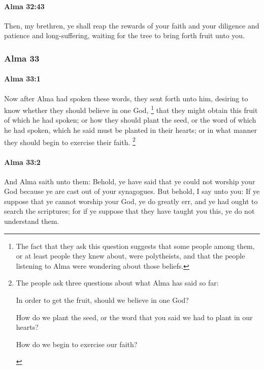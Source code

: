 		\paragraph{Alma 32:43} %
			\label{ALMA-32-43}

			Then, my brethren, ye shall reap the rewards of your faith
			and your diligence and patience and long-suffering,
			waiting for the tree to bring forth fruit unto you.

	\subsubsection{Alma 33} %
		\label{ALMA-33}
		
		\paragraph{Alma 33:1} %
			\label{ALMA-33-1}

			Now after Alma had spoken these words,
			they sent forth unto him, desiring to know
			whether they should believe in one God,%
				\footnote{%
					The fact that they ask this question suggests that some people among them, or at least people they knew about, were polytheists, and that the people listening to Alma were wondering about those beliefs.
					}
			that they might obtain this fruit of which he had spoken;
			or how they should plant the seed, or the word of which he had spoken,
			which he said must be planted in their hearts;
			or in what manner they should begin to exercise their faith.%
				\footnote{%
					The people ask three questions about what Alma has said so far:
						\begin{compactitem}
							\item In order to get the fruit, should we believe in one God?
							\item How do we plant the seed, or the word that you said we had to plant in our hearts?
							\item How do we begin to exercise our faith?
						\end{compactitem}
					}

		\paragraph{Alma 33:2} %
			\label{ALMA-33-2}

			And Alma saith unto them:
			Behold, ye have said that ye could not worship your God
			because ye are cast out of your synagogues.
			But behold, I say unto you:
			If ye suppose that ye cannot worship your God, ye do greatly err,
			and ye had ought to search the scriptures;
			for if ye suppose that they have taught you this,
			ye do not understand them.

